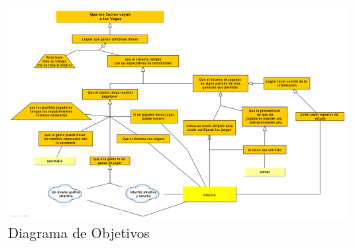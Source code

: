         

        \begin{figure}[p!hbt]
		\centering
		\includegraphics[angle=90, width=0.8\textwidth]{../img/DO.png}
		\caption{Diagrama de Objetivos }
		\label{fig:Objetivos}
	\end{figure}
